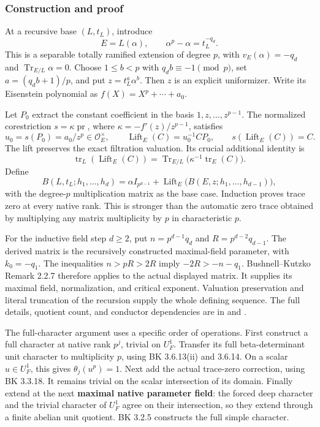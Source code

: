 \hypertarget{odd_synthesis-construction-and-proof}{%
\subsubsection{Construction and proof}\label{odd_synthesis-construction-and-proof}}

At a recursive base \((L,t_L)\), introduce \[
E=L(\alpha),\qquad \alpha^p-\alpha=t_L^{-q_d}.
\] This is a separable totally ramified extension of degree \(p\), with
\(v_E(\alpha)=-q_d\) and \(\operatorname{Tr}_{E/L}\alpha=0\). Choose
\(1\le b<p\) with \(q_db\equiv-1\pmod p\), set \(a=(q_db+1)/p\), and put
\(z=t_L^a\alpha^b\). Then \(z\) is an explicit uniformizer. Write its
Eisenstein polynomial as \(f(X)=X^p+\cdots+a_0\).

Let \(P_0\) extract the constant coefficient in the basis
\(1,z,\ldots,z^{p-1}\). The normalized corestriction
\(s=\kappa\operatorname{pr}\), where \(\kappa=-f'(z)/z^{p-1}\),
satisfies \[
u_0=s(P_0)=a_0/z^p\in\mathcal O_E^\times,
\qquad
\operatorname{Lift}_E(C)=u_0^{-1}CP_0,
\qquad s(\operatorname{Lift}_E(C))=C.
\] The lift preserves the exact filtration valuation. Its crucial
additional identity is \[
\operatorname{tr}_L(\operatorname{Lift}_E(C))
 =\operatorname{Tr}_{E/L}
   \bigl(\kappa^{-1}\operatorname{tr}_E(C)\bigr).
\] Define \[
B(L,t_L;h_1,\ldots,h_d)
 =\alpha I_{p^{d-1}}+
   \operatorname{Lift}_E\bigl(B(E,z;h_1,\ldots,h_{d-1})\bigr),
\] with the degree-\(p\) multiplication matrix as the base case.
Induction proves trace zero at every native rank. This is stronger than
the automatic zero trace obtained by multiplying any matrix multiplicity
by \(p\) in characteristic \(p\).

For the inductive field step \(d\ge2\), put \(n=p^{d-1}q_d\) and
\(R=p^{d-2}q_{d-1}\). The derived matrix is the recursively constructed
maximal-field parameter, with \(k_0=-q_1\). The inequalities \(n>pR>2R\)
imply \(-2R>-n-q_1\). Bushnell--Kutzko Remark 2.2.7 therefore applies to
the actual displayed matrix. It supplies its maximal field,
normalization, and critical exponent. Valuation preservation and literal
truncation of the recursion supply the whole defining sequence. The full
details, quotient count, and conductor dependencies are in
 and
.

The full-character argument uses a specific order of operations. First
construct a full character at native rank \(p^j\), trivial on \(U_F^1\).
Transfer its full beta-determinant unit character to multiplicity \(p\),
using BK 3.6.13(ii) and 3.6.14. On a scalar \(u\in U_F^1\), this gives
\(\theta_j(u^p)=1\). Next add the actual trace-zero correction, using BK
3.3.18. It remains trivial on the scalar intersection of its domain.
Finally extend at the next \textbf{maximal native parameter field}: the
forced deep character and the trivial character of \(U_F^1\) agree on
their intersection, so they extend through a finite abelian unit
quotient. BK 3.2.5 constructs the full simple character.

